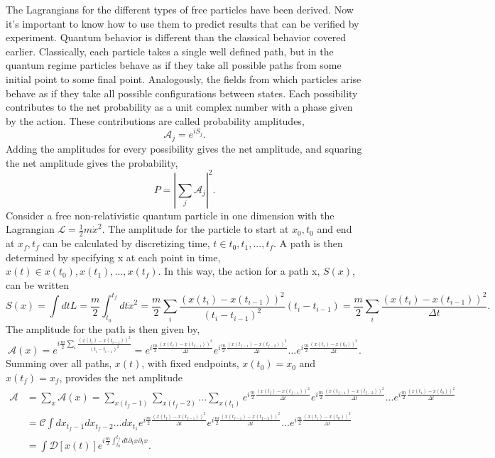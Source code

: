 The Lagrangians for the different types of free particles have been derived. Now it's important to know how to use them to predict results that can be verified by experiment. Quantum behavior is different than the classical behavior covered earlier. Classically, each particle takes a single well defined path, but in the quantum regime particles behave as if they take all possible paths from some initial point to some final point. Analogously, the fields from which particles arise behave as if they take all possible configurations between states. Each possibility contributes to the net probability as a unit complex number with a phase given by the action. These contributions are called probability amplitudes, 
\begin{equation}
\mathcal{A}_j = e^{iS_{j}}. 
\end{equation}
Adding the amplitudes for every possibility gives the net amplitude, and squaring the net amplitude gives the probability,   
\begin{equation}
P = |\sum_j \mathcal{A}_j|^2.
\end{equation}
Consider a free non-relativistic quantum particle in one dimension with the Lagrangian $\mathcal{L} = \frac{1}{2}m\dot{x}^2$. The amplitude for the particle to start at $x_0, t_0$ and end at $x_f, t_f$ can be calculated by discretizing time, $t \in {t_0, t_1, ..., t_f}$. A path is then determined by specifying x at each point in time, $x(t) \in {x(t_0), x(t_1), ..., x(t_f)}$. In this way, the action for a path x, $S(x)$, can be written
\begin{equation}
S(x) = \int dt L = \frac{m}{2} \int_{t_0}^{t_f} dt \dot{x}^2 = \frac{m}{2} \sum_i \frac{(x(t_i) - x(t_{i-1}))^2}{(t_i - t_{i-1})^2} (t_i - t_{i-1})  
= \frac{m}{2} \sum_i \frac{(x(t_i) - x(t_{i-1}))^2}{\Delta t}.
\end{equation}
The amplitude for the path is then given by, 
\begin{equation}
\mathcal{A}(x) = e^{i\frac{m}{2} \sum_i \frac{(x(t_i) - x(t_{i-1}))^2}{(t_i - t_{i-1})^2}} = e^{i\frac{m}{2}\frac{(x(t_f) - x(t_{f-1}))^2}{\Delta t}}e^{i\frac{m}{2}\frac{(x(t_{f-1}) - x(t_{f-2}))^2}{\Delta t}}...e^{i\frac{m}{2}\frac{(x(t_1) - x(t_{0}))^2}{\Delta t}}.
\end{equation}
Summing over all paths, $x(t)$, with fixed endpoints, $x(t_0) = x_0$ and $x(t_f) = x_f$, provides the net amplitude 
\begin{equation}
\begin{split}
\mathcal{A} &= \sum_{x} \mathcal{A}(x) = \sum_{x(t_f-1)} \sum_{x(t_f-2)} ... \sum_{x(t_1)} 
e^{i\frac{m}{2}\frac{(x(t_f) - x(t_{f-1}))^2}{\Delta t}}e^{i\frac{m}{2}\frac{(x(t_{f-1}) - x(t_{f-2}))^2}{\Delta t}}...
e^{i\frac{m}{2}\frac{(x(t_1) - x(t_{0}))^2}{\Delta t}} \\
&= \mathcal{C} \int dx_{t_f-1}dx_{t_f-2}...dx_{t_1} 
e^{i\frac{m}{2}\frac{(x(t_f) - x(t_{f-1}))^2}{\Delta t}}e^{i\frac{m}{2}\frac{(x(t_{f-1}) - x(t_{f-2}))^2}{\Delta t}}...
e^{i\frac{m}{2}\frac{(x(t_1) - x(t_{0}))^2}{\Delta t}}\\
& = \int \mathcal{D}[x(t)] e^{i\frac{m}{2}\int_{t_0}^{t_f} dt \partial_t x \partial_t x}.\\
\end{split}
\end{equation} 
